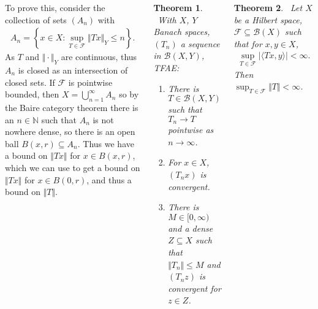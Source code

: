 \documentclass{tikzposter} %
\newcommand{\rightopen}[2]{\ensuremath{[#1,#2)}}
\newtheorem{theorem}{Theorem}
\newtheorem{lemma}[theorem]{Lemma}
\newtheorem{definition}{Definition}
\begin{document}
\begin{columns}
{{      To prove this, consider the collection of sets $(A_{n})$ with
      \begin{align*}
      A_{n} = \left\{x \in X : \sup_{T \in \mathcal{F}} \Vert Tx \Vert_{Y} \le n\right\}.
      \end{align*}
      As $T$ and $\Vert \cdot \Vert_{Y}$ are continuous, thus $A_{n}$ is closed as an intersection of closed sets. If $\mathcal{F}$ is pointwise bounded, then $X = \bigcup_{n = 1}^{\infty} A_{n}$ so by the Baire category theorem there is an $n \in \mathbb{N}$ such that $A_{n}$ is not nowhere dense, so there is an open ball $B(x,r) \subseteq A_{n}$. Thus we have a bound on $\Vert Tx \Vert$ for $x \in B(x,r)$, which we can use to get a bound on $\Vert Tx \Vert$ for $x \in B(0,r)$, and thus a bound on $\Vert T \Vert$. \\

      \begin{theorem}
      \ With $X$, $Y$ Banach spaces, $(T_{n})$ a sequence in $\mathcal{B}(X,Y)$, TFAE:
      \begin{enumerate}[label=\roman*.]
              \item There is $T \in \mathcal{B}(X,Y)$ such that $T_{n} \to T$ pointwise as $n \to \infty$.
              \item For $x \in X$, $(T_{n}x)$ is convergent.
              \item There is $M \in \rightopen{0}{\infty}$ and a dense $Z \subseteq X$ such that $\Vert T_{n} \Vert \leq M$ and $(T_{n}z)$ is convergent for $z \in Z$.
      \end{enumerate}
      \end{theorem}
      \hphantom{}

      \begin{theorem}
      \ Let $X$ be a Hilbert space, $\mathcal{F} \subseteq \mathcal{B}(X)$ such that for $x, y \in X$,
      \begin{align*}
        \sup_{T \in \mathcal{F}} | \langle Tx, y \rangle | < \infty.
      \end{align*}
      Then $\sup_{T \in \mathcal{F}} \Vert T \Vert < \infty$.
      \end{theorem}
    }
    \hphantom{}
    }
\end{columns}
\end{document}
